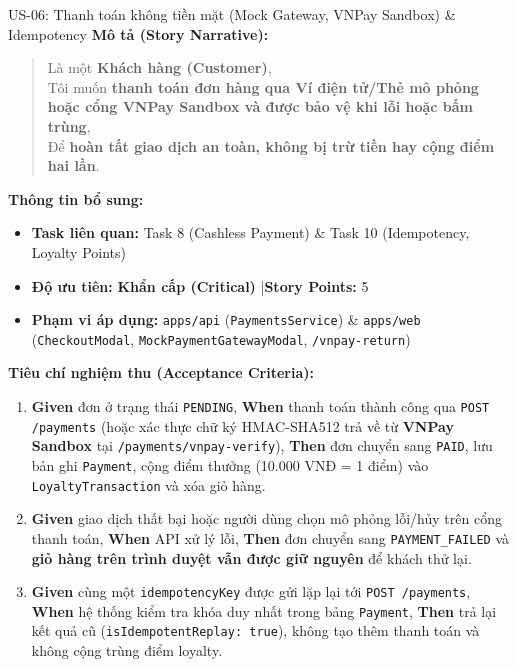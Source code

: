 \documentclass[12pt,a4paper]{article}
\begin{document}
\vspace{0.4cm}

\begin{userstorybox}{US-06: Thanh toán không tiền mặt (Mock Gateway, VNPay Sandbox) \& Idempotency}
    \textbf{Mô tả (Story Narrative):}
    \begin{quote}
        Là một \textbf{Khách hàng (Customer)},\\
        Tôi muốn \textbf{thanh toán đơn hàng qua Ví điện tử/Thẻ mô phỏng hoặc cổng VNPay Sandbox và được bảo vệ khi lỗi hoặc bấm trùng},\\
        Để \textbf{hoàn tất giao dịch an toàn, không bị trừ tiền hay cộng điểm hai lần}.
    \end{quote}

    \textbf{Thông tin bổ sung:}
    \begin{itemize}[noitemsep]
        \item \textbf{Task liên quan:} Task 8 (Cashless Payment) \& Task 10 (Idempotency, Loyalty Points)
        \item \textbf{Độ ưu tiên:} \textcolor{taghigh}{\textbf{Khẩn cấp (Critical)}} \quad|\quad \textbf{Story Points:} 5
        \item \textbf{Phạm vi áp dụng:} \texttt{apps/api} (\texttt{PaymentsService}) \& \texttt{apps/web} (\texttt{CheckoutModal}, \texttt{MockPaymentGatewayModal}, \texttt{/vnpay-return})
    \end{itemize}

    \textbf{Tiêu chí nghiệm thu (Acceptance Criteria):}
    \begin{enumerate}[noitemsep]
        \item \textbf{Given} đơn ở trạng thái \texttt{PENDING}, \textbf{When} thanh toán thành công qua \texttt{POST /payments} (hoặc xác thực chữ ký HMAC-SHA512 trả về từ \textbf{VNPay Sandbox} tại \texttt{/payments/vnpay-verify}), \textbf{Then} đơn chuyển sang \texttt{PAID}, lưu bản ghi \texttt{Payment}, cộng điểm thưởng (10.000 VNĐ = 1 điểm) vào \texttt{LoyaltyTransaction} và xóa giỏ hàng.
        \item \textbf{Given} giao dịch thất bại hoặc người dùng chọn mô phỏng lỗi/hủy trên cổng thanh toán, \textbf{When} API xử lý lỗi, \textbf{Then} đơn chuyển sang \texttt{PAYMENT\_FAILED} và \textbf{giỏ hàng trên trình duyệt vẫn được giữ nguyên} để khách thử lại.
        \item \textbf{Given} cùng một \texttt{idempotencyKey} được gửi lặp lại tới \texttt{POST /payments}, \textbf{When} hệ thống kiểm tra khóa duy nhất trong bảng \texttt{Payment}, \textbf{Then} trả lại kết quả cũ (\texttt{isIdempotentReplay: true}), không tạo thêm thanh toán và không cộng trùng điểm loyalty.
    \end{enumerate}
\end{userstorybox}
\end{document}
